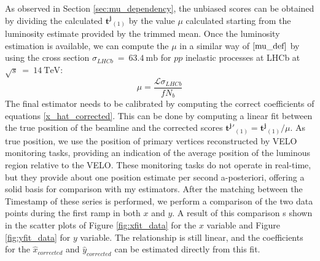 As observed in Section \ref{sec:mu_dependency}, the unbiased scores can be obtained by dividing the calculated $\mathbf{t^j}_{(1)}$ by the value $\mu$ calculated starting from the luminosity estimate provided by the trimmed mean. Once the luminosity estimation is available, we can compute the $\mu$ in a similar way of $\eqref{mu_def}$ by using the cross section $\sigma_{LHCb}~=~\SI{63.4}{\milli\barn}$ for $pp$ inelastic processes at LHCb at $\sqrt{s}~=~\SI{14}{\tera\eV}$:
\begin{equation}
    \mu = \frac{\mathcal{L}\sigma_{LHCb}}{f N_b}
\end{equation}
The final estimator needs to be calibrated by computing the correct coefficients of equations \ref{x_hat_corrected}. This can be done by computing a linear fit between the true position of the beamline and the corrected scores $\mathbf{t^j}'_{(1)}=\mathbf{t^j}_{(1)}/\mu$. As true position, we use the position of primary vertices reconstructed by VELO monitoring tasks, providing an indication of the average position of the luminous region relative to the VELO. These monitoring tasks do not operate in real-time, but they provide about one position estimate per second a-posteriori, offering a solid basis for comparison with my estimators. After the matching between the Timestamp of these series is performed, we perform a comparison of the two data points during the first ramp in both $x$ and $y$. A result of this comparison s shown in the scatter plots of Figure \ref{fig:xfit_data} for the $x$ variable and Figure \ref{fig:yfit_data} for $y$ variable. The relationship is still linear, and the coefficients for the $\hat{x}_{corrected}$ and $\hat{y}_{corrected}$ can be estimated directly from this fit.

